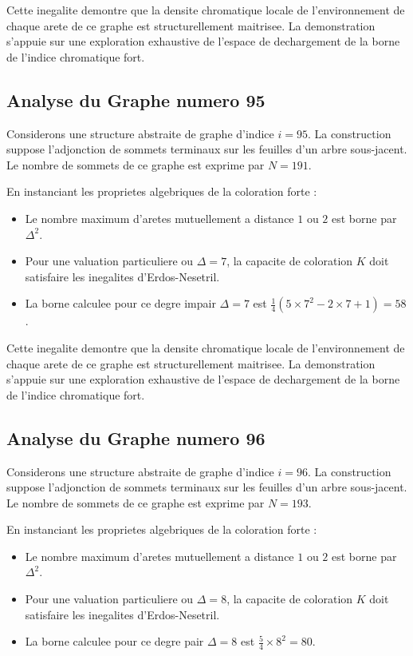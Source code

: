 \documentclass[11pt,a4paper]{article}
\begin{document}
Cette inegalite demontre que la densite chromatique locale de l'environnement de chaque arete de ce graphe est structurellement maitrisee. La demonstration s'appuie sur une exploration exhaustive de l'espace de dechargement de la borne de l'indice chromatique fort.

\subsection{Analyse du Graphe numero 95}
Considerons une structure abstraite de graphe d'indice $i = 95$. La construction suppose l'adjonction de sommets terminaux sur les feuilles d'un arbre sous-jacent. Le nombre de sommets de ce graphe est exprime par $N = 191$.

En instanciant les proprietes algebriques de la coloration forte :
\begin{itemize}
\item Le nombre maximum d'aretes mutuellement a distance $1$ ou $2$ est borne par $\Delta^2$.
\item Pour une valuation particuliere ou $\Delta = 7$, la capacite de coloration $K$ doit satisfaire les inegalites d'Erdos-Nesetril.
\item La borne calculee pour ce degre impair $\Delta = 7$ est $\frac{1}{4}(5 \times 7^2 - 2 \times 7 + 1) = 58$.
\end{itemize}

Cette inegalite demontre que la densite chromatique locale de l'environnement de chaque arete de ce graphe est structurellement maitrisee. La demonstration s'appuie sur une exploration exhaustive de l'espace de dechargement de la borne de l'indice chromatique fort.

\subsection{Analyse du Graphe numero 96}
Considerons une structure abstraite de graphe d'indice $i = 96$. La construction suppose l'adjonction de sommets terminaux sur les feuilles d'un arbre sous-jacent. Le nombre de sommets de ce graphe est exprime par $N = 193$.

En instanciant les proprietes algebriques de la coloration forte :
\begin{itemize}
\item Le nombre maximum d'aretes mutuellement a distance $1$ ou $2$ est borne par $\Delta^2$.
\item Pour une valuation particuliere ou $\Delta = 8$, la capacite de coloration $K$ doit satisfaire les inegalites d'Erdos-Nesetril.
\item La borne calculee pour ce degre pair $\Delta = 8$ est $\frac{5}{4} \times 8^2 = 80$.
\end{itemize}
\end{document}
